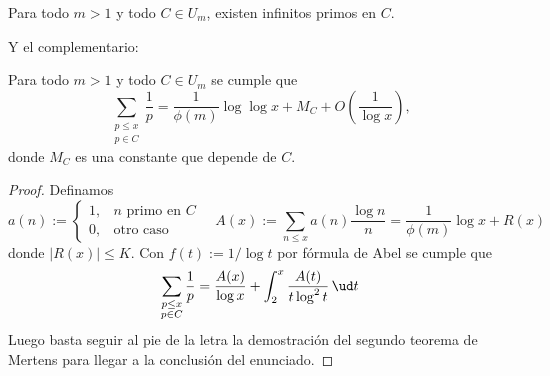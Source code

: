 \documentclass[teoria-numeros.tex]{subfiles}
\begin{document}
\begin{thmi}
	Para todo $m > 1$ y todo $C \in U_m$, existen infinitos primos en $C$.
\end{thmi}

Y el complementario:
\begin{thm}
	Para todo $m > 1$ y todo $C \in U_m$ se cumple que
	$$ \sum_{\substack{p\le x \\ p\in C}} \frac{1}{p} = \frac{1}{\phi(m)} \log\log x + M_C + O\left( \frac{1}{\log x} \right), $$
	donde $M_C$ es una constante que depende de $C$.
\end{thm}
\begin{proof}
	Definamos
	$$ a(n) :=
	\begin{cases}
		1, &n \text{ primo en $C$} \\
		0, &\text{otro caso}
	\end{cases} \quad
	A(x) := \sum_{n\le x} a(n)\frac{\log n}{n} = \frac{1}{\phi(m)}\log x + R(x) $$
	donde $|R(x)| \le K$.
	Con $f(t) := 1/\log t$ por fórmula de Abel se cumple que
	$$ \sum_{\substack{p\le x \\ p\in C}} \frac{1}{p} = \frac{A(x)}{\log x} + \int_{2}^{x} \frac{A(t)}{t\log^2 t} \, \ud t $$
	Luego basta seguir al pie de la letra la demostración del segundo teorema de Mertens para llegar a la conclusión del enunciado.
\end{proof}


\printbibliography[segment=\therefsegment, check=onlynew, notcategory=historical, notcategory=other]
\bibbycategory[segment=\therefsegment, check=onlynew]
\end{document}
